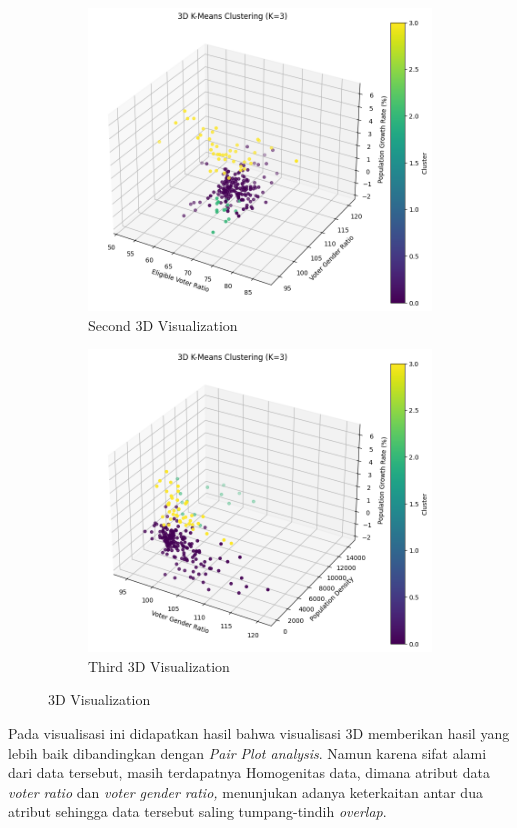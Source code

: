 \begin{figure}[h]
\begin{subfigure}{0.5\textwidth}
\end{subfigure}
\begin{subfigure}{0.5\textwidth}
        \includegraphics[width=1\linewidth]{images/second_3d_visual.png}
    \caption{Second 3D Visualization}
    \label{fig:second_3d_visual}

\end{subfigure}
\begin{subfigure}{1\textwidth}
    \centering
    \includegraphics[width=0.5\linewidth]{images/third_3d_visual.png}
    \caption{Third 3D Visualization}
    \label{fig:third_3d_visual}
\end{subfigure}

    \caption{3D Visualization}
    \label{fig:3d_visual}

\end{figure}

Pada visualisasi ini didapatkan hasil bahwa visualisasi 3D memberikan hasil yang lebih baik dibandingkan dengan \textit{Pair Plot analysis}. Namun karena sifat alami dari data tersebut, masih terdapatnya Homogenitas data, dimana atribut data \textit{voter ratio} dan \textit{voter gender ratio, } menunjukan adanya keterkaitan antar dua atribut sehingga data tersebut saling tumpang-tindih \textit{overlap}.

